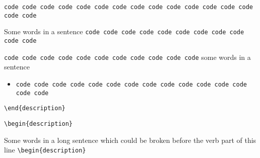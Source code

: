 


\verb|code code code code code code code code code code code code code code code code|


Some words in a sentence
\verb|code code code code code code code code code code code|

\verb|code code code code code code code code code code code| some
words in a sentence


\begin{itemize}
  \item
    \verb|code code code code code code code code code code code code code code code|
\end{itemize}


\verb|\end{description}|

\verb|\begin{description}|


Some words in a long sentence which could be broken before the verb
part of this line \verb|\begin{description}|


\verb|     |


